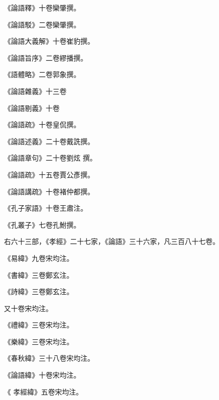 \begin{pinyinscope}
 《論語釋》十卷欒肇撰。



 《論語駁》二卷欒肇撰。



 《論語大義解》十卷崔豹撰。



 《論語旨序》二卷繆播撰。



 《語體略》二卷郭象撰。



 《論語雜義》十三卷



 《論語剔義》十卷



 《論語疏》十卷皇侃撰。



 《論語述義》二十卷戴詵撰。



 《論語章句》二十卷劉炫
 撰。



 《論語疏》十五卷賈公彥撰。



 《論語講疏》十卷褚仲都撰。



 《孔子家語》十卷王肅注。



 《孔叢子》七卷孔鮒撰。



 右六十三部，《孝經》二十七家，《論語》三十六家，凡三百八十七卷。



 《易緯》九卷宋均注。



 《書緯》三卷鄭玄注。



 《詩緯》三卷鄭玄注。



 又十卷宋均注。



 《禮緯》三卷宋均注。



 《樂緯》三卷宋均注。



 《春秋緯》三十八卷宋均注。



 《論語緯》十卷宋均注。



 《
 孝經緯》五卷宋均注。




\end{pinyinscope}
